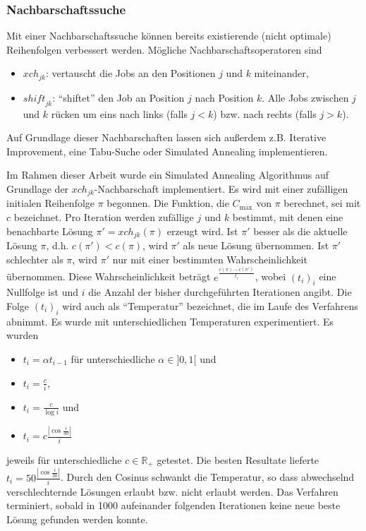 \documentclass{scrreprt}
\begin{document}
\subsubsection{Nachbarschaftssuche}
\label{subsubsec:Nachbarschaftssuche}
Mit einer Nachbarschaftssuche können bereits existierende (nicht optimale) Reihenfolgen verbessert werden.
Mögliche Nachbarschaftsoperatoren sind
\begin{itemize}
    \item $\mathit{xch}_{jk}$: vertauscht die Jobs an den Positionen $j$ und $k$ miteinander,
    \item $\mathit{shift}_{jk}$: "`shiftet"' den Job an Position $j$ nach Position $k$. 
        Alle Jobs zwischen $j$ und $k$ rücken um eins nach links (falls $j<k$) bzw. nach rechts (falls $j>k$).
\end{itemize}
Auf Grundlage dieser Nachbarschaften lassen sich außerdem z.B. Iterative Improvement, eine Tabu-Suche oder Simulated Annealing implementieren.

Im Rahmen dieser Arbeit wurde ein Simulated Annealing Algorithmus auf Grundlage der $\mathit{xch}_{jk}$-Nachbarschaft implementiert.
Es wird mit einer zufälligen initialen Reihenfolge $\pi$ begonnen.
Die Funktion, die $C_{\max}$ von $\pi$ berechnet, sei mit $c$ bezeichnet.
Pro Iteration werden zufällige $j$ und $k$ bestimmt, mit denen eine benachbarte Lösung $\pi' = \mathit{xch}_{jk}(\pi)$ erzeugt wird.
Ist $\pi'$ besser als die aktuelle Lösung $\pi$, d.h. $c(\pi') < c(\pi)$, wird $\pi'$ als neue Lösung übernommen.
Ist $\pi'$ schlechter als $\pi$, wird $\pi'$ nur mit einer bestimmten Wahrscheinlichkeit übernommen.
Diese Wahrscheinlichkeit beträgt $e^{\frac{c(\pi)-c(\pi')}{t_i}}$, wobei $(t_i)_i$ eine Nullfolge ist 
und $i$ die Anzahl der bisher durchgeführten Iterationen angibt.
Die Folge $(t_i)_i$ wird auch als "`Temperatur"' bezeichnet, die im Laufe des Verfahrens abnimmt.
Es wurde mit unterschiedlichen Temperaturen experimentiert.
Es wurden 
\begin{itemize}
    \item $t_i = \alpha t_{i-1}$ für unterschiedliche $\alpha\in]0,1[$ und 
    \item $t_i = \frac{c}{i}$, 
    \item $t_i = \frac{c}{\log i}$ und 
    \item $t_i = c \frac{|\cos\frac{i}{30}|}{i}$
\end{itemize}
jeweils für unterschiedliche $c\in\mathbb{R}_+$ getestet. Die besten Resultate lieferte $t_i = 50\frac{|\cos\frac{i}{30}|}{i}$.
Durch den Cosinus schwankt die Temperatur, so dass abwechselnd verschlechternde Lösungen erlaubt bzw. nicht erlaubt werden.
Das Verfahren terminiert, sobald in 1000 aufeinander folgenden Iterationen keine neue beste Lösung gefunden werden konnte.
\end{document}
